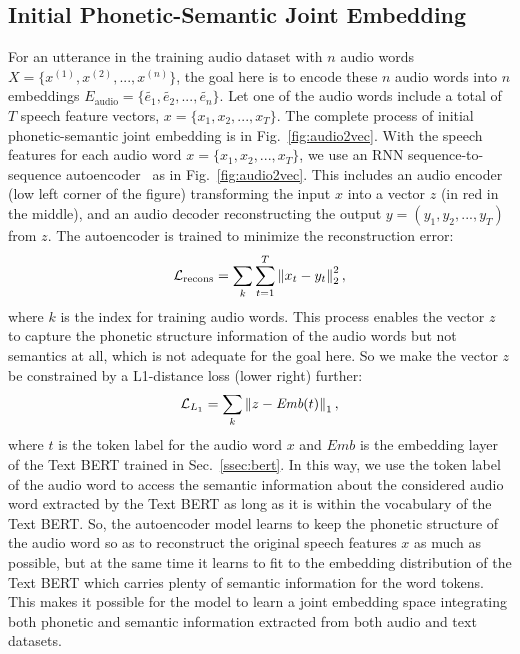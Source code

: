 \documentclass[a4paper]{article}
\begin{document}
\subsection{Initial Phonetic-Semantic Joint Embedding}
\label{ssec:sse}
\vspace{-3pt}
For an utterance in the training audio dataset with $n$ audio words $X = \{x^{(1)}, x^{(2)}, ..., x^{(n)}\}$, the goal here is to encode these $n$ audio words into $n$ embeddings $E_{\text{audio}} = \{\tilde{e_1}, \tilde{e_2}, ..., \tilde{e_n}\}$. Let one of the audio words include a total of $T$ speech feature vectors, $x = \{x_1, x_2, ..., x_T\}$. The complete process of initial phonetic-semantic joint embedding is in Fig.~\ref{fig:audio2vec}. 
With the speech features for each audio word $x = \{x_1, x_2, ..., x_T\}$, we use an RNN sequence-to-sequence autoencoder~\cite{chung2016audio} as in Fig.~\ref{fig:audio2vec}. This includes an audio encoder (low left corner of the figure) transforming the input $x$ into a vector $z$ (in red in the middle), and an audio decoder reconstructing the output $y = (y_1, y_2, ..., y_T)$ from $z$. The autoencoder is trained to minimize the reconstruction error:
\vspace{-10pt}
\begin{equation}
\mathcal{L}_{\rm recons} = \sum_{k}\sum_{t=1}^{T}\left\|x_{t}-y_{t}\right\|^{2}_2,
\vspace{-5pt}
\end{equation}
where $k$ is the index for training audio words. This process enables the vector $z$ to capture the phonetic structure information of the audio words but not semantics at all, which is not adequate for the goal here. So we make the vector $z$ be constrained by a L1-distance loss (lower right) further:
\vspace{-5pt}
\begin{equation}
\mathcal{L}_{L_1} = \sum_{k}\left\|z-\textit{Emb}(t)\right\|_{1},
\vspace{-7pt}
\end{equation}
where $t$ is the token label for the audio word $x$ and $\textit{Emb}$ is the embedding layer of the Text BERT trained in Sec.~\ref{ssec:bert}. In this way, we use the token label of the audio word to access the semantic information about the considered audio word extracted by the Text BERT as long as it is within the vocabulary of the Text BERT. So, the autoencoder model learns to keep the phonetic structure of the audio word so as to reconstruct the original speech features $x$ as much as possible, but at the same time it learns to fit to the embedding distribution of the Text BERT which carries plenty of semantic information for the word tokens. This makes it possible for the model to learn a joint embedding space integrating both phonetic and semantic information extracted from both audio and text datasets.
\end{document}

